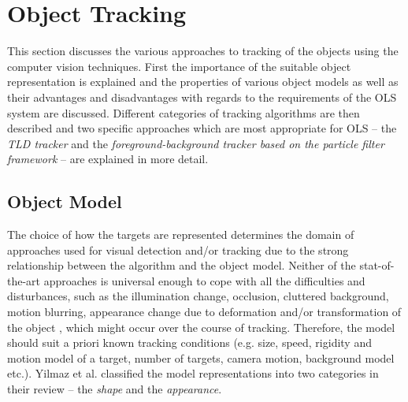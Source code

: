 \section{Object Tracking} \label{txt:object_tracking}

This section discusses the various approaches to tracking of the objects using the computer vision techniques. First the importance of the suitable object representation is explained and the properties of various object models as well as their advantages and disadvantages with regards to the requirements of the OLS system are discussed. Different categories of tracking algorithms are then described and two specific approaches which are most appropriate for OLS -- the \textit{TLD tracker} and the \textit{foreground-background tracker based on the particle filter framework} -- are explained in more detail.

\subsection{Object Model} \label{txt:object_model}

The choice of how the targets are represented determines the domain of approaches used for visual detection and/or tracking due to the strong relationship between the algorithm and the object model. Neither of the stat-of-the-art approaches is universal enough to cope with all the difficulties and disturbances, such as the illumination change, occlusion, cluttered background, motion blurring, appearance change due to deformation and/or transformation of the object \cite{Li:2013:SAM:2508037.2508039}, which might occur over the course of tracking. Therefore, the model should suit a priori known tracking conditions (e.g. size, speed, rigidity and motion model of a target, number of targets, camera motion, background model etc.). Yilmaz et al. classified the model representations into two categories in their review \cite{Yilmaz:2006:OTS:1177352.1177355} -- the \textit{shape} and the \textit{appearance}. 


